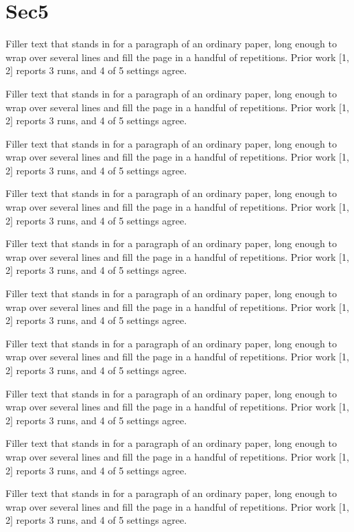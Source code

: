 \documentclass{article}
\begin{document}
\section{Sec5}
Filler text that stands in for a paragraph of an ordinary paper, long enough to wrap over several lines and fill the page in a handful of repetitions. Prior work [1, 2] reports 3 runs, and 4 of 5 settings agree.\par
Filler text that stands in for a paragraph of an ordinary paper, long enough to wrap over several lines and fill the page in a handful of repetitions. Prior work [1, 2] reports 3 runs, and 4 of 5 settings agree.\par
Filler text that stands in for a paragraph of an ordinary paper, long enough to wrap over several lines and fill the page in a handful of repetitions. Prior work [1, 2] reports 3 runs, and 4 of 5 settings agree.\par
Filler text that stands in for a paragraph of an ordinary paper, long enough to wrap over several lines and fill the page in a handful of repetitions. Prior work [1, 2] reports 3 runs, and 4 of 5 settings agree.\par
Filler text that stands in for a paragraph of an ordinary paper, long enough to wrap over several lines and fill the page in a handful of repetitions. Prior work [1, 2] reports 3 runs, and 4 of 5 settings agree.\par
Filler text that stands in for a paragraph of an ordinary paper, long enough to wrap over several lines and fill the page in a handful of repetitions. Prior work [1, 2] reports 3 runs, and 4 of 5 settings agree.\par
Filler text that stands in for a paragraph of an ordinary paper, long enough to wrap over several lines and fill the page in a handful of repetitions. Prior work [1, 2] reports 3 runs, and 4 of 5 settings agree.\par
Filler text that stands in for a paragraph of an ordinary paper, long enough to wrap over several lines and fill the page in a handful of repetitions. Prior work [1, 2] reports 3 runs, and 4 of 5 settings agree.\par
Filler text that stands in for a paragraph of an ordinary paper, long enough to wrap over several lines and fill the page in a handful of repetitions. Prior work [1, 2] reports 3 runs, and 4 of 5 settings agree.\par
Filler text that stands in for a paragraph of an ordinary paper, long enough to wrap over several lines and fill the page in a handful of repetitions. Prior work [1, 2] reports 3 runs, and 4 of 5 settings agree.\par
\end{document}
